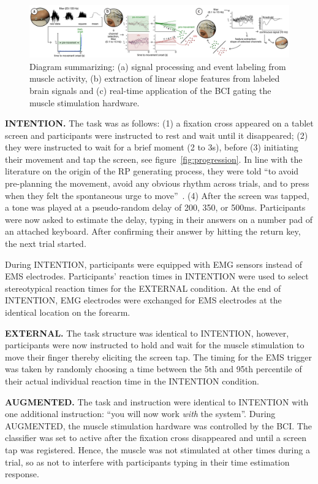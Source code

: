 \begin{figure}[t]
    \centering
    \includegraphics[width=\textwidth]{figures/method.png}
    \caption{Diagram summarizing: (a) signal processing and event labeling from muscle activity, (b) extraction of linear slope features from labeled brain signals and (c) real-time application of the BCI gating the muscle stimulation hardware.}
    \label{fig:method}
\end{figure}

\indent\textbf{INTENTION.} The task was as follows: (1) a fixation cross appeared on a tablet screen and participants were instructed to rest and wait until it disappeared; (2) they were instructed to wait for a brief moment (2 to 3s), before (3) initiating their movement and tap the screen, see figure~\ref{fig:progression}. In line with the literature on the origin of the RP generating process, they were told ``to avoid pre-planning the movement, avoid any obvious rhythm across trials, and to press when they felt the spontaneous urge to move''~\cite{Schultze-Kraft2021-cu}. (4) After the screen was tapped, a tone was played at a pseudo-random delay of 200, 350, or 500ms. Participants were now asked to estimate the delay, typing in their answers on a number pad of an attached keyboard. After confirming their answer by hitting the return key, the next trial started.

During INTENTION, participants were equipped with EMG sensors instead of EMS electrodes. Participants' reaction times in INTENTION were used to select stereotypical reaction times for the EXTERNAL condition. At the end of INTENTION, EMG electrodes were exchanged for EMS electrodes at the identical location on the forearm.

\indent\textbf{EXTERNAL.} The task structure was identical to INTENTION, however, participants were now instructed to hold and wait for the muscle stimulation to move their finger thereby eliciting the screen tap. The timing for the EMS trigger was taken by randomly choosing a time between the 5th and 95th percentile of their actual individual reaction time in the INTENTION condition. 

\indent\textbf{AUGMENTED.} The task and instruction were identical to INTENTION with one additional instruction: ``you will now work \textit{with} the system''. During AUGMENTED, the muscle stimulation hardware was controlled by the BCI. The classifier was set to active after the fixation cross disappeared and until a screen tap was registered. Hence, the muscle was not stimulated at other times during a trial, so as not to interfere with participants typing in their time estimation response.

